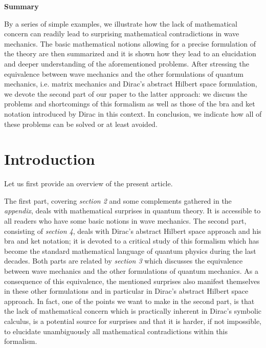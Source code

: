 \documentclass[12pt]{report}
\begin{document}
\bigskip
\begin{center}
{\bf \large{Summary}}
\end{center}
By a series of simple examples, we illustrate 
how the lack of mathematical concern can readily lead to 
surprising mathematical contradictions in wave mechanics.
The basic mathematical notions allowing for a precise 
formulation of the theory are then summarized and it 
is shown how they lead to 
an elucidation and deeper understanding 
of the aforementioned problems. 
After stressing the equivalence between  wave mechanics 
and the other formulations of quantum mechanics, 
i.e. matrix mechanics and Dirac's abstract Hilbert space 
formulation,  we devote the second part of our paper 
to the latter approach: 
we discuss the problems and shortcomings of this 
formalism as well as those of the bra and ket notation 
introduced by Dirac in this context. In conclusion, 
we indicate how all of these problems can be solved 
or at least avoided.


 
\newpage
 
\tableofcontents
 
\newpage
 
\setcounter{page}{1}
 
 
\chapter{Introduction}

Let us first provide an overview of the present article. 


The first part,  covering {\em section 2}
and some complements gathered in the  
{\em appendix}, 
deals with mathematical surprises in quantum theory. It 
is accessible to all 
readers who have some basic notions in wave mechanics. 
The second part, consisting of {\em section 4},   
 deals with Dirac's abstract Hilbert space approach and 
his bra and ket notation; it 
is devoted to a critical study 
of this formalism which has become the  
standard mathematical language 
of quantum physics during the last decades. 
Both parts are related by  {\em section 3} 
which discusses the equivalence between wave mechanics
and the other formulations of quantum mechanics.  
 As a consequence of this equivalence, 
the mentioned surprises  also manifest themselves in 
these other formulations and in particular 
in Dirac's abstract Hilbert space approach. 
In fact, one of the points
we want to make in the second part, 
is that the lack of mathematical concern 
which is practically inherent in Dirac's symbolic calculus,
is a potential source for surprises and that it is harder, 
if not impossible, to
elucidate unambiguously all mathematical contradictions within this
formalism. 
\end{document}
